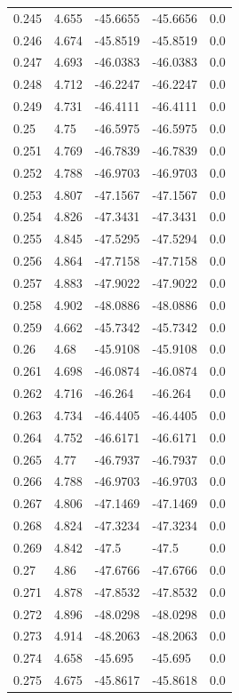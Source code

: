 \begin{table}[H]
\begin{tabular}{lllll}
0.245 & 4.655 & -45.6655 & -45.6656 & 0.0 \\
0.246 & 4.674 & -45.8519 & -45.8519 & 0.0 \\
0.247 & 4.693 & -46.0383 & -46.0383 & 0.0 \\
0.248 & 4.712 & -46.2247 & -46.2247 & 0.0 \\
0.249 & 4.731 & -46.4111 & -46.4111 & 0.0 \\
0.25 & 4.75 & -46.5975 & -46.5975 & 0.0 \\
0.251 & 4.769 & -46.7839 & -46.7839 & 0.0 \\
0.252 & 4.788 & -46.9703 & -46.9703 & 0.0 \\
0.253 & 4.807 & -47.1567 & -47.1567 & 0.0 \\
0.254 & 4.826 & -47.3431 & -47.3431 & 0.0 \\
0.255 & 4.845 & -47.5295 & -47.5294 & 0.0 \\
0.256 & 4.864 & -47.7158 & -47.7158 & 0.0 \\
0.257 & 4.883 & -47.9022 & -47.9022 & 0.0 \\
0.258 & 4.902 & -48.0886 & -48.0886 & 0.0 \\
0.259 & 4.662 & -45.7342 & -45.7342 & 0.0 \\
0.26 & 4.68 & -45.9108 & -45.9108 & 0.0 \\
0.261 & 4.698 & -46.0874 & -46.0874 & 0.0 \\
0.262 & 4.716 & -46.264 & -46.264 & 0.0 \\
0.263 & 4.734 & -46.4405 & -46.4405 & 0.0 \\
0.264 & 4.752 & -46.6171 & -46.6171 & 0.0 \\
0.265 & 4.77 & -46.7937 & -46.7937 & 0.0 \\
0.266 & 4.788 & -46.9703 & -46.9703 & 0.0 \\
0.267 & 4.806 & -47.1469 & -47.1469 & 0.0 \\
0.268 & 4.824 & -47.3234 & -47.3234 & 0.0 \\
0.269 & 4.842 & -47.5 & -47.5 & 0.0 \\
0.27 & 4.86 & -47.6766 & -47.6766 & 0.0 \\
0.271 & 4.878 & -47.8532 & -47.8532 & 0.0 \\
0.272 & 4.896 & -48.0298 & -48.0298 & 0.0 \\
0.273 & 4.914 & -48.2063 & -48.2063 & 0.0 \\
0.274 & 4.658 & -45.695 & -45.695 & 0.0 \\
0.275 & 4.675 & -45.8617 & -45.8618 & 0.0 \\

\end{tabular}
\end{table}
